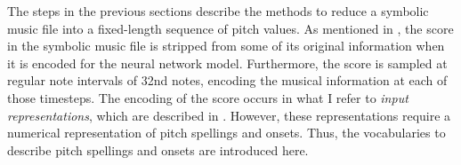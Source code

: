 
The steps in the previous sections describe the methods to
reduce a symbolic music file into a fixed-length sequence of
pitch values. As mentioned in
, the score in the symbolic
music file is stripped from some of its original information
when it is encoded for the neural network model.
Furthermore, the score is sampled at regular note intervals
of \gls{32nd} notes, encoding the musical information at
each of those timesteps. The encoding of the score occurs in
what I refer to \emph{input representations}, which are
described in . However,
these representations require a numerical representation of
pitch spellings and onsets. Thus, the vocabularies to describe pitch spellings and onsets are introduced here.


